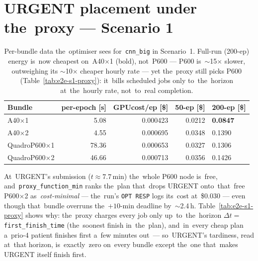 \section{URGENT placement under the~proxy --- Scenario 1}
\label{sec:e2e-s1-urgent}

\begin{table}[H]\centering\small
\begin{tabularx}{\textwidth}{@{}l r r rX@{}}\toprule
Bundle & per-epoch [s] & GPUcost/ep [\$] & 50-ep [\$] & 200-ep [\$]\\\midrule
A40$\times$1        & 5.08   & 0.000423 & 0.0212 & \textbf{0.0847} \\
A40$\times$2        & 4.55   & 0.000695 & 0.0348 & 0.1390  \\
QuadroP600$\times$1 & 78.36  & 0.000653 & 0.0327 & 0.1306 \\
QuadroP600$\times$2 & 46.66  & 0.000713 & 0.0356 & 0.1426 \\\bottomrule
\end{tabularx}
\caption{Per-bundle data the~optimiser sees for~\texttt{cnn\_big} in
Scenario~1.  Full-run (200-ep) energy is~now cheapest on~A40$\times$1
(bold), not~P600 --- P600 is~$\sim$15$\times$ slower, outweighing its
$\sim$10$\times$ cheaper hourly rate --- yet the~proxy still picks P600
(Table~\ref{tab:e2e-s1-proxy}): it~bills scheduled jobs only to~the~horizon
at~the~hourly rate, not~to~real completion.}\label{tab:e2e-s1-opt}
\end{table}

At~URGENT's submission ($t{\approx}7.7$\,min) the~whole P600 node is~free,
and~\texttt{proxy\_function\_min} ranks the~plan that~drops URGENT
onto~that~free P600$\times$2 as~\emph{cost-minimal} --- the~run's
\texttt{OPT RESP} logs its~cost at~\$0.030 --- even though that~bundle
overruns the~$+10$-min deadline by~$\sim$2.4\,h.  Table~\ref{tab:e2e-s1-proxy}
shows why: the~proxy charges every job only up~to~the~horizon
$\Delta t={}$\texttt{first\_finish\_time} (the~soonest finish in~the~plan),
and~in~every cheap plan a~prio-4 patient finishes first a~few minutes
out~--- so~URGENT's tardiness, read at~that horizon, is~exactly~zero
on~every bundle except the~one that~makes URGENT itself finish first.

